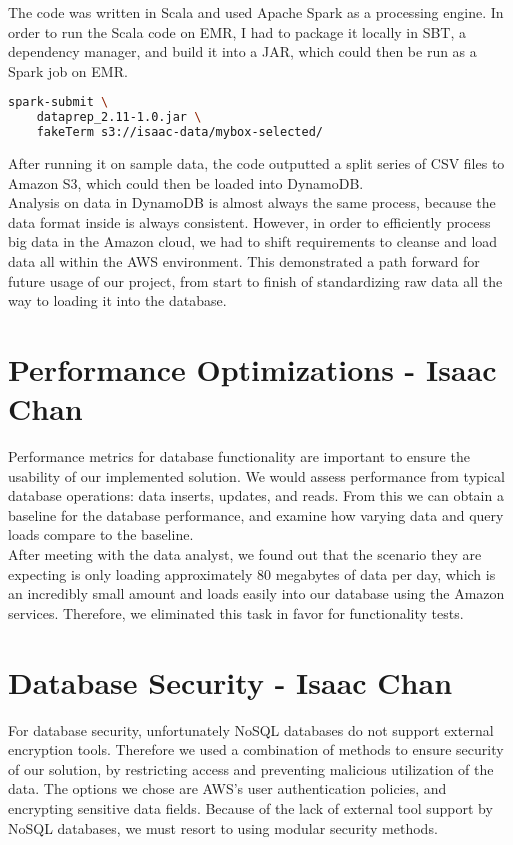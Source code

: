 \noindent The code was written in Scala and used Apache Spark as a processing engine. In order to run the Scala code on EMR, I had to package it locally in SBT, a dependency manager, and build it into a JAR, which could then be run as a Spark job on EMR.\\
 
\begin{lstlisting}[language=sh, caption=Spark Submit]
spark-submit \
	dataprep_2.11-1.0.jar \
	fakeTerm s3://isaac-data/mybox-selected/
\end{lstlisting}
 
\noindent After running it on sample data, the code outputted a split series of CSV files to Amazon S3, which could then be loaded into DynamoDB.\\

\noindent Analysis on data in DynamoDB is almost always the same process, because the data format inside is always consistent. However, in order to efficiently process big data in the Amazon cloud, we had to shift requirements to cleanse and load data all within the AWS environment. This demonstrated a path forward for future usage of our project, from start to finish of standardizing raw data all the way to loading it into the database.\\

\section{Performance Optimizations - Isaac Chan}
Performance metrics for database functionality are important to ensure the usability of our implemented solution. We would assess performance from typical database operations: data inserts, updates, and reads. From this we can obtain a baseline for the database performance, and examine how varying data and query loads compare to the baseline.\\ 

\noindent After meeting with the data analyst, we found out that the scenario they are expecting is only loading approximately 80 megabytes of data per day, which is an incredibly small amount and loads easily into our database using the Amazon services. Therefore, we eliminated this task in favor for functionality tests.

\section{Database Security - Isaac Chan}
For database security, unfortunately NoSQL databases do not support external encryption tools. Therefore we used a combination of methods to ensure security of our solution, by restricting access and preventing malicious utilization of the data. The options we chose are AWS’s user authentication policies, and encrypting sensitive data fields. Because of the lack of external tool support by NoSQL databases, we must resort to using modular security methods.\\


